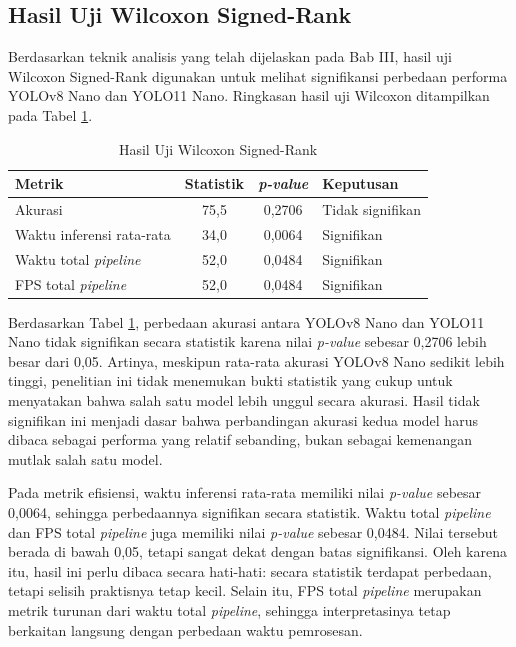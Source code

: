 \begin{sectioncontent}
    \subsection{Hasil Uji Wilcoxon Signed-Rank}
    \begin{subsectioncontent}
        \hspace{\parindent}Berdasarkan teknik analisis yang telah dijelaskan pada Bab III, hasil uji Wilcoxon Signed-Rank digunakan untuk melihat signifikansi perbedaan performa YOLOv8 Nano dan YOLO11 Nano. Ringkasan hasil uji Wilcoxon ditampilkan pada Tabel \ref{tab:wilcoxon}.

        \begin{table}[H]
            \centering
            \caption{Hasil Uji Wilcoxon Signed-Rank}
            \label{tab:wilcoxon}
            \small
            \renewcommand{\arraystretch}{1.3}
            \begin{tabularx}{\textwidth}{|l|c|c|X|}
                \hline
                \textbf{Metrik} & \textbf{Statistik} & \textbf{\textit{p-value}} & \textbf{Keputusan} \\
                \hline
                Akurasi & 75,5 & 0,2706 & Tidak signifikan \\
                \hline
                Waktu inferensi rata-rata & 34,0 & 0,0064 & Signifikan \\
                \hline
                Waktu total \textit{pipeline} & 52,0 & 0,0484 & Signifikan \\
                \hline
                FPS total \textit{pipeline} & 52,0 & 0,0484 & Signifikan \\
                \hline
            \end{tabularx}
        \end{table}

        Berdasarkan Tabel \ref{tab:wilcoxon}, perbedaan akurasi antara YOLOv8 Nano dan YOLO11 Nano tidak signifikan secara statistik karena nilai \textit{p-value} sebesar 0,2706 lebih besar dari 0,05. Artinya, meskipun rata-rata akurasi YOLOv8 Nano sedikit lebih tinggi, penelitian ini tidak menemukan bukti statistik yang cukup untuk menyatakan bahwa salah satu model lebih unggul secara akurasi. Hasil tidak signifikan ini menjadi dasar bahwa perbandingan akurasi kedua model harus dibaca sebagai performa yang relatif sebanding, bukan sebagai kemenangan mutlak salah satu model.

        Pada metrik efisiensi, waktu inferensi rata-rata memiliki nilai \textit{p-value} sebesar 0,0064, sehingga perbedaannya signifikan secara statistik. Waktu total \textit{pipeline} dan FPS total \textit{pipeline} juga memiliki nilai \textit{p-value} sebesar 0,0484. Nilai tersebut berada di bawah 0,05, tetapi sangat dekat dengan batas signifikansi. Oleh karena itu, hasil ini perlu dibaca secara hati-hati: secara statistik terdapat perbedaan, tetapi selisih praktisnya tetap kecil. Selain itu, FPS total \textit{pipeline} merupakan metrik turunan dari waktu total \textit{pipeline}, sehingga interpretasinya tetap berkaitan langsung dengan perbedaan waktu pemrosesan.


\end{subsectioncontent}
\end{sectioncontent}
